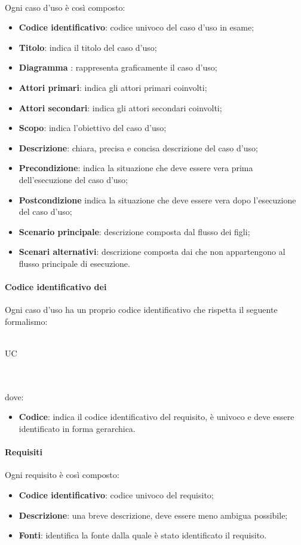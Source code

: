  \paragraph{}
 Ogni caso d'uso è così composto:
 \begin{itemize}
  \item \textbf{Codice identificativo}: codice univoco del caso d'uso in esame;
  \item \textbf{Titolo}: indica il titolo del caso d'uso;
  \item \textbf{Diagramma }: rappresenta graficamente il caso d'uso;
  \item \textbf{Attori primari}: indica gli attori primari coinvolti;
  \item \textbf{Attori secondari}: indica gli attori secondari coinvolti;
  \item \textbf{Scopo}: indica l'obiettivo del caso d'uso;
  \item \textbf{Descrizione}: chiara, precisa e concisa descrizione del caso d'uso;
  \item \textbf{Precondizione}: indica la situazione che deve essere vera prima dell'esecuzione del caso d'uso;
  \item \textbf{Postcondizione} indica la situazione che deve essere vera dopo l'esecuzione del caso d'uso;
  \item \textbf{Scenario principale}: descrizione composta dal flusso dei  figli;
  \item \textbf{Scenari alternativi}: descrizione composta dai  che non appartengono al flusso
principale di esecuzione.
 \end{itemize}
 \paragraph{Codice identificativo dei }
Ogni caso d'uso ha un proprio codice identificativo  che rispetta il seguente formalismo:\\ \\
\centerline{UC\textbraceright{}}
\\ \\dove:
\begin{itemize}
	\item \textbf{Codice}: indica il codice identificativo del requisito, è univoco e deve essere identificato in forma gerarchica.
\end{itemize}
 \paragraph{Requisiti}
 Ogni requisito è così composto:
  \begin{itemize}
  \item \textbf{Codice identificativo}: codice univoco del requisito;
  \item \textbf{Descrizione}: una breve descrizione, deve essere meno ambigua possibile;
  \item \textbf{Fonti}: identifica la fonte dalla quale è stato identificato il requisito.
 \end{itemize}
